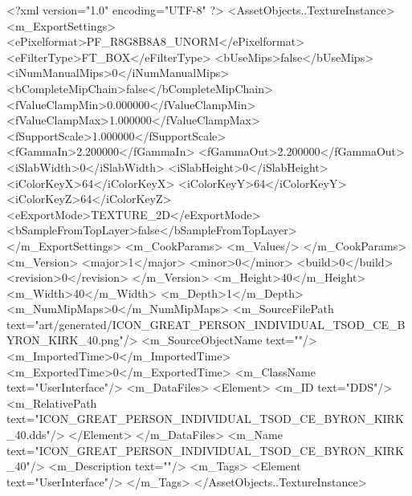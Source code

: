 <?xml version="1.0" encoding="UTF-8" ?>
<AssetObjects..TextureInstance>
	<m_ExportSettings>
		<ePixelformat>PF_R8G8B8A8_UNORM</ePixelformat>
		<eFilterType>FT_BOX</eFilterType>
		<bUseMips>false</bUseMips>
		<iNumManualMips>0</iNumManualMips>
		<bCompleteMipChain>false</bCompleteMipChain>
		<fValueClampMin>0.000000</fValueClampMin>
		<fValueClampMax>1.000000</fValueClampMax>
		<fSupportScale>1.000000</fSupportScale>
		<fGammaIn>2.200000</fGammaIn>
		<fGammaOut>2.200000</fGammaOut>
		<iSlabWidth>0</iSlabWidth>
		<iSlabHeight>0</iSlabHeight>
		<iColorKeyX>64</iColorKeyX>
		<iColorKeyY>64</iColorKeyY>
		<iColorKeyZ>64</iColorKeyZ>
		<eExportMode>TEXTURE_2D</eExportMode>
		<bSampleFromTopLayer>false</bSampleFromTopLayer>
	</m_ExportSettings>
	<m_CookParams>
		<m_Values/>
	</m_CookParams>
	<m_Version>
		<major>1</major>
		<minor>0</minor>
		<build>0</build>
		<revision>0</revision>
	</m_Version>
	<m_Height>40</m_Height>
	<m_Width>40</m_Width>
	<m_Depth>1</m_Depth>
	<m_NumMipMaps>0</m_NumMipMaps>
	<m_SourceFilePath text="art/generated/ICON_GREAT_PERSON_INDIVIDUAL_TSOD_CE_BYRON_KIRK_40.png"/>
	<m_SourceObjectName text=""/>
	<m_ImportedTime>0</m_ImportedTime>
	<m_ExportedTime>0</m_ExportedTime>
	<m_ClassName text="UserInterface"/>
	<m_DataFiles>
		<Element>
			<m_ID text="DDS"/>
			<m_RelativePath text="ICON_GREAT_PERSON_INDIVIDUAL_TSOD_CE_BYRON_KIRK_40.dds"/>
		</Element>
	</m_DataFiles>
	<m_Name text="ICON_GREAT_PERSON_INDIVIDUAL_TSOD_CE_BYRON_KIRK_40"/>
	<m_Description text=""/>
	<m_Tags>
		<Element text="UserInterface"/>
	</m_Tags>
</AssetObjects..TextureInstance>
